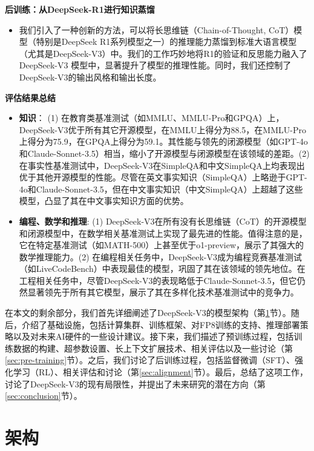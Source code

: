 \documentclass[lang=cn,a4paper,newtx]{elegantpaper}
\newcommand{\dsviii}{DeepSeek-V3}
\begin{document}
\noindent
\textbf{后训练：从DeepSeek-R1进行知识蒸馏}
\begin{itemize}[topsep=0pt]
    \item 
    我们引入了一种创新的方法，可以将长思维链（Chain-of-Thought, CoT）模型（特别是DeepSeek R1系列模型之一）的推理能力蒸馏到标准大语言模型（尤其是DeepSeek-V3）中。我们的工作巧妙地将R1的验证和反思能力融入了 DeepSeek-V3 模型中，显著提升了模型的推理性能。同时，我们还控制了DeepSeek-V3的输出风格和输出长度。
\end{itemize}

\noindent
\textbf{评估结果总结}
\begin{itemize}[topsep=0pt]
    \item \textbf{知识}：
    (1) 在教育类基准测试（如MMLU、MMLU-Pro和GPQA）上，DeepSeek-V3优于所有其它开源模型，在MMLU上得分为88.5，在MMLU-Pro上得分为75.9，在GPQA上得分为59.1。其性能与领先的闭源模型（如GPT-4o和Claude-Sonnet-3.5）相当，缩小了开源模型与闭源模型在该领域的差距。(2) 在事实性基准测试中，DeepSeek-V3在SimpleQA和中文SimpleQA上均表现出优于其他开源模型的性能。尽管在英文事实知识（SimpleQA）上略逊于GPT-4o和Claude-Sonnet-3.5，但在中文事实知识（中文SimpleQA）上超越了这些模型，凸显了其在中文事实知识方面的优势。
    \item \textbf{编程、数学和推理}: 
    (1) DeepSeek-V3在所有没有长思维链（CoT）的开源模型和闭源模型中，在数学相关基准测试上实现了最先进的性能。值得注意的是，它在特定基准测试（如MATH-500）上甚至优于o1-preview，展示了其强大的数学推理能力。(2) 在编程相关任务中，DeepSeek-V3成为编程竞赛基准测试（如LiveCodeBench）中表现最佳的模型，巩固了其在该领域的领先地位。在工程相关任务中，尽管DeepSeek-V3的表现略低于Claude-Sonnet-3.5，但它仍然显著领先于所有其它模型，展示了其在多样化技术基准测试中的竞争力。
\end{itemize}

在本文的剩余部分，我们首先详细阐述了\dsviii{}的模型架构（第\ref{sec:arch}节）。随后，介绍了基础设施，包括计算集群、训练框架、对FP8训练的支持、推理部署策略以及对未来AI硬件的一些设计建议。接下来，我们描述了预训练过程，包括训练数据的构建、超参数设置、长上下文扩展技术、相关评估以及一些讨论（第\ref{sec:pre-training}节）。之后，我们讨论了后训练过程，包括监督微调（SFT）、强化学习（RL）、相关评估和讨论（第\ref{sec:alignment}节）。最后，总结了这项工作，讨论了\dsviii{}的现有局限性，并提出了未来研究的潜在方向（第\ref{sec:conclusion}节）。

\section{架构}
\label{sec:arch}
\end{document}
